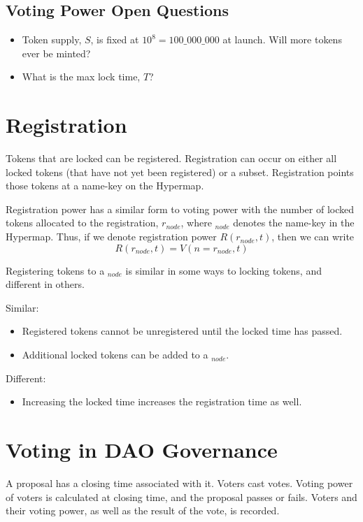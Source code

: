 \documentclass{article}
\begin{document}
\subsection{Voting Power Open Questions}
\begin{itemize}
    \item Token supply, $S$, is fixed at $10^8 = 100\_000\_000$ at launch.
      Will more tokens ever be minted?
    \item What is the max lock time, $T$?
\end{itemize}

\section{Registration}\label{sec:registration}

Tokens that are locked can be registered.
Registration can occur on either all locked tokens (that have not yet been registered) or a subset.
Registration points those tokens at a name-key on the Hypermap.

Registration power has a similar form to voting power with the number of locked tokens allocated to the registration, $r_{node}$, where $_{node}$ denotes the name-key in the Hypermap.
Thus, if we denote registration power $R(r_{node}, t)$, then we can write
\begin{equation}
R(r_{node}, t) = V(n=r_{node}, t)
\end{equation}

Registering tokens to a $_{node}$ is similar in some ways to locking tokens, and different in others.

Similar:
\begin{itemize}
    \item Registered tokens cannot be unregistered until the locked time has passed.
    \item Additional locked tokens can be added to a $_{node}$.
\end{itemize}

Different:
\begin{itemize}
    \item Increasing the locked time increases the registration time as well.
\end{itemize}

\section{Voting in DAO Governance}

A proposal has a closing time associated with it.
Voters cast votes.
Voting power of voters is calculated at closing time, and the proposal passes or fails.
Voters and their voting power, as well as the result of the vote, is recorded.
\end{document}
